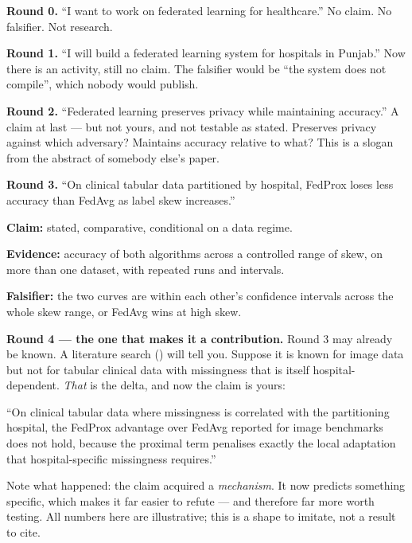 \begin{worked}
\textbf{Round 0.} ``I want to work on federated learning for healthcare.''
No claim. No falsifier. Not research.

\medskip
\textbf{Round 1.} ``I will build a federated learning system for hospitals in
Punjab.'' Now there is an activity, still no claim. The falsifier would be
``the system does not compile'', which nobody would publish.

\medskip
\textbf{Round 2.} ``Federated learning preserves privacy while maintaining
accuracy.'' A claim at last --- but not yours, and not testable as stated.
Preserves privacy against which adversary? Maintains accuracy relative to
what? This is a slogan from the abstract of somebody else's paper.

\medskip
\textbf{Round 3.} ``On clinical tabular data partitioned by hospital, FedProx
loses less accuracy than FedAvg as label skew increases.''
\begin{tight}
  \item \textbf{Claim:} stated, comparative, conditional on a data regime.
  \item \textbf{Evidence:} accuracy of both algorithms across a controlled
    range of skew, on more than one dataset, with repeated runs and intervals.
  \item \textbf{Falsifier:} the two curves are within each other's confidence
    intervals across the whole skew range, or FedAvg wins at high skew.
\end{tight}

\medskip
\textbf{Round 4 --- the one that makes it a contribution.} Round 3 may already
be known. A literature search () will tell you. Suppose it is known
for image data but not for tabular clinical data with missingness that is
itself hospital-dependent. \emph{That} is the delta, and now the claim is
yours:

\medskip
``On clinical tabular data where missingness is correlated with the
partitioning hospital, the FedProx advantage over FedAvg reported for image
benchmarks does not hold, because the proximal term penalises exactly the
local adaptation that hospital-specific missingness requires.''

\medskip
Note what happened: the claim acquired a \emph{mechanism}. It now predicts
something specific, which makes it far easier to refute --- and therefore far
more worth testing. All numbers here are illustrative; this is a shape to
imitate, not a result to cite.
\end{worked}

